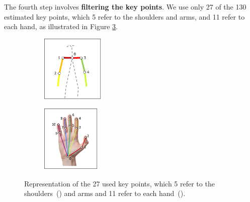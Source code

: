 
    
The fourth step involves \textbf{filtering the key points}. We use only 27 of the 130 estimated key points, which 5 refer to the shoulders and arms, and 11 refer to each hand, as illustrated in Figure \ref{fig:filtered-keypoints}. %



\begin{figure}
    \centering
    \begin{subfigure}{3.0cm}
        \centering
        \includegraphics[height=3.2cm]{images/filtered_keypoints_body}
        \caption{}
        \label{fig:filtered-keypoints-body}
    \end{subfigure}
    \begin{subfigure}{3.0cm}
      \centering
      \includegraphics[height=3.2cm]{images/filtered_keypoints_hand}
      \caption{}
      \label{fig:filtered-keypoints-hand}
    \end{subfigure}
    \caption{
        Representation of the 27 used key points, which 5 refer to the shoulders~() and arms and 11 refer to each hand~().
    }
    \label{fig:filtered-keypoints}
\end{figure}

